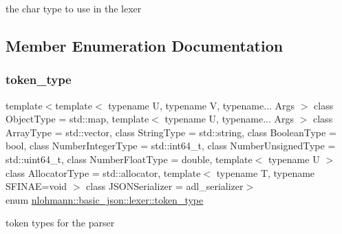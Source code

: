 the char type to use in the lexer 



\subsection{Member Enumeration Documentation}
\mbox{\label{classnlohmann_1_1basic__json_1_1lexer_a96887d6cd131e3d3a85a9d71fbdbcdf7}} 
\subsubsection{\texorpdfstring{token\+\_\+type}{token\_type}}
{\footnotesize\ttfamily template$<$template$<$ typename U, typename V, typename... Args $>$ class Object\+Type = std\+::map, template$<$ typename U, typename... Args $>$ class Array\+Type = std\+::vector, class String\+Type  = std\+::string, class Boolean\+Type  = bool, class Number\+Integer\+Type  = std\+::int64\+\_\+t, class Number\+Unsigned\+Type  = std\+::uint64\+\_\+t, class Number\+Float\+Type  = double, template$<$ typename U $>$ class Allocator\+Type = std\+::allocator, template$<$ typename T, typename S\+F\+I\+N\+A\+E=void $>$ class J\+S\+O\+N\+Serializer = adl\+\_\+serializer$>$ \\
enum \hyperlink{classnlohmann_1_1basic__json_1_1lexer_a96887d6cd131e3d3a85a9d71fbdbcdf7}{nlohmann\+::basic\+\_\+json\+::lexer\+::token\+\_\+type}\hspace{0.3cm}{\ttfamily [strong]}}



token types for the parser 

